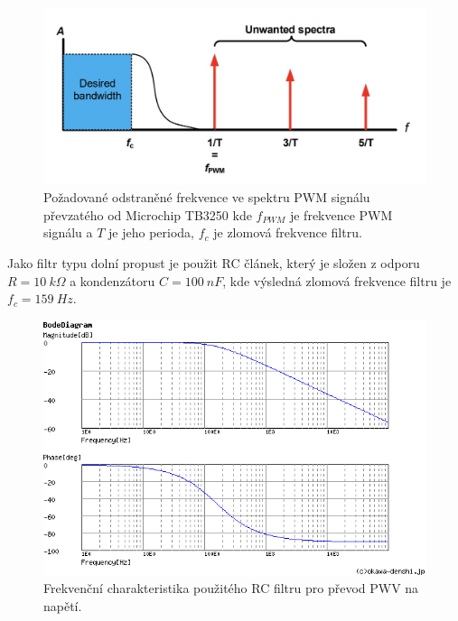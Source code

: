 \begin{figure}[H]
    \centering
    \includegraphics[width=1\linewidth]{pictures/rc_pwm_spectrum_microchip90003250A.jpg}
    \caption{Požadované odstraněné frekvence ve spektru PWM signálu převzatého od Microchip TB3250 kde $f_{PWM}$ je frekvence PWM signálu a $T$ je jeho perioda, $f_{c}$ je zlomová frekvence filtru.\cite{cite:MCPPWV}}
    \label{fig:unwanted_pwm_spectrum}
\end{figure}

Jako filtr typu dolní propust je použit RC článek, který je složen z odporu $R = 10 \ k\Omega$ a kondenzátoru $C = 100 \ nF$, kde výsledná zlomová frekvence filtru je $f_c = 159 \ Hz$.

\begin{figure}[H]
    \centering
    \includegraphics[width=1\linewidth]{pictures/var_rc_filter.png}
    \caption{Frekvenční charakteristika použitého RC filtru pro převod PWV na napětí.\cite{cite:RCResponse}}
    \label{fig:var_rc_filter_char}
\end{figure}

